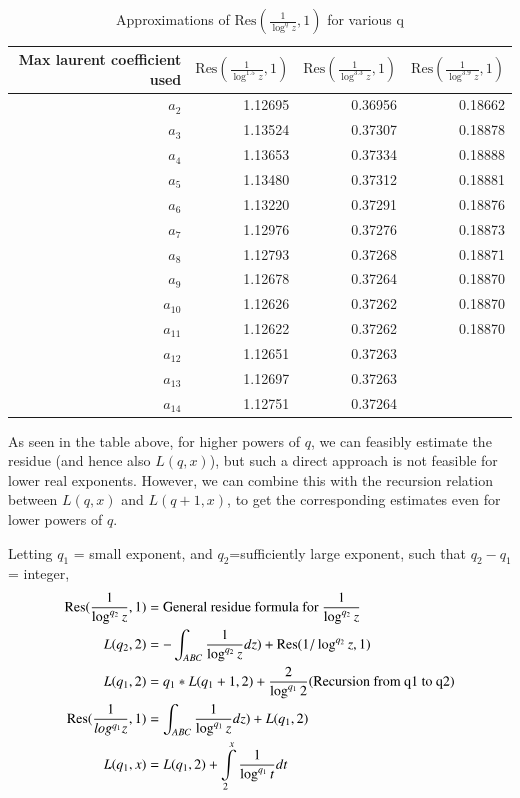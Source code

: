 \documentclass[a4paper,11pt,twoside]{amsart}
\newcommand\Res{\mathrm{Res}}
\begin{document}
\begin{table}[H]
  \begin{center}
    \begin{tabular}{r|r|r|r} %
      Max laurent coefficient used & $\Res(\frac{1}{\log^{1.5} z},1)$ & $\Res(\frac{1}{\log^{3.3} z},1)$ & $\Res(\frac{1}{\log^{3.9} z},1)$	\\
      \hline
      $a_2$ &  1.12695 & 0.36956 & 0.18662\\
      $a_3$ &  1.13524 & 0.37307 & 0.18878\\
      $a_4$ &  1.13653 & 0.37334 & 0.18888\\
      $a_5$ &  1.13480 & 0.37312 & 0.18881\\
      $a_6$ &  1.13220 & 0.37291 & 0.18876\\
      $a_7$ &  1.12976 & 0.37276 & 0.18873\\
      $a_8$ &  1.12793 & 0.37268 & 0.18871\\
      $a_9$ &  1.12678 & 0.37264 & 0.18870\\
      $a_{10}$ & 1.12626 & 0.37262 & 0.18870\\
      $a_{11}$ & 1.12622 & 0.37262 & 0.18870\\
      $a_{12}$ & 1.12651 & 0.37263 & \\
      $a_{13}$ & 1.12697 & 0.37263 & \\
      $a_{14}$ & 1.12751 & 0.37264 & \\
    \end{tabular}
  \caption{Approximations of $\Res(\frac{1}{\log^{q} z},1)$ for various q}
  \end{center}
\end{table}
\vspace{-2em}
As seen in the table above, for higher powers of $q$, we can feasibly estimate the residue (and hence also $L(q,x)$), but such a direct approach is not feasible for lower real exponents. However, we can combine this with the recursion relation between $L(q,x)$ and $L(q+1,x)$, to get the corresponding estimates even for lower powers of $q$.

Letting $q_1$ = small exponent, and $q_2$=sufficiently large exponent, such that $q_2 - q_1$ = integer, 
\begin{align}
\Res(\frac{1}{\log^{q_2} z},1) &= \text{General residue formula for } \frac{1}{\log^{q_2} z} \notag \\
L(q_2,2) &= -\int_{ABC} \frac{1}{\log^{q_2} z} dz) + \Res(1/\log^{q_2} z,1)\notag \\
L(q_1,2) &= {q_1}*L(q_1 + 1,2) + \frac{2}{\log^{q_1} 2} \text{(Recursion from q1 to q2)} \notag\\
\Res(\frac{1}{log^{q_1} z},1) &= \int_{ABC} \frac{1}{\log^{q_1} z} dz) + L(q_1,2)\notag \\
L(q_1,x) &= L(q_1,2) + \int\limits_{2}^{x}\frac{1}{\log^{q_1} t} dt\notag 
\notag
\end{align}
\end{document}
